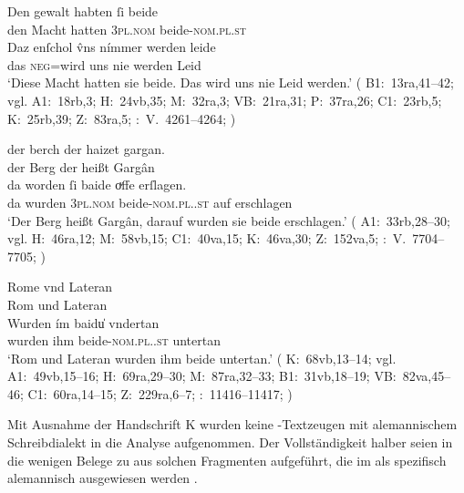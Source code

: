 \begin{exe}
\ex \label{ex:neutralpos}
	\gll Den gewalt habten ſi beide \\
		den Macht hatten \textsc{3pl\subM.nom} beide-\textsc{nom.pl\subM.st} \\
\sn \gll Daz enſchol v̂ns nímmer werden leide \\
		das \textsc{neg}=wird uns nie werden Leid \\
	\trans `Diese Macht hatten sie beide. Das wird uns nie Leid werden.'
		(%
			B1:~13ra,41--42; vgl.
			A1:~18rb,3;
			H:~24vb,35;
			M:~32ra,3;
			VB:~21ra,31;
			P:~37ra,26;
			C1:~23rb,5;
			K:~25rb,39;
			Z:~83ra,5;
			\KC:~V.~4261--4264;
			\cite[159]{schroeder1895}%
		)

\ex \label{ex:neutralpos2}
	\begin{xlist}
	\ex \label{ex:neutralpos2_1}
		\gll der berch der haizet gargan. \\
			der Berg der heißt Gargân \\
	\sn \gll da worden ſi baide oͮffe erſlagen. \\
			da wurden \textsc{3pl\subM.nom} beide-\textsc{nom.pl.\MascM.st} auf
				erschlagen \\
		\trans `Der Berg heißt Gargân, darauf wurden sie beide erschlagen.'
			(%
				A1:~33rb,28--30; vgl.
				H:~46ra,12;
				M:~58vb,15;
				C1:~40va,15;
				K:~46va,30;
				Z:~152va,5;
				\KC:~V.~7704--7705;
				\cite[222]{schroeder1895}%
			)

	\ex \label{ex:neutralpos2_2}
		\gll Rome vnd Lateran \\
			Rom und Lateran \\
	\sn \gll Wurden ím baidu̍ vndertan \\
			wurden ihm beide-\textsc{nom.pl.\NeutI.st} untertan \\
		\trans `Rom und Lateran wurden ihm beide untertan.'
			(%
				K:~68vb,13--14; vgl.
				A1:~49vb,15--16;
				H:~69ra,29--30;
				M:~87ra,32--33;
				B1:~31vb,18--19;
				VB:~82va,45--46;
				C1:~60ra,14--15;
				Z:~229ra,6--7;
				\KC:~11416--11417;
				\cite[290]{schroeder1895}%
			)
		\\
	\end{xlist}
\end{exe}

Mit Ausnahme der Handschrift K wurden keine \KC{}-Text\-zeugen mit
alemannischem Schreibdialekt in die Analyse aufgenommen. Der Vollständigkeit
halber seien in  die wenigen Belege zu  aus
solchen Fragmenten aufgeführt, die im \citet{hsc} als spezifisch alemannisch
ausgewiesen werden \autocite[vgl.][4, 44, 54]{wolf:kckat}.


